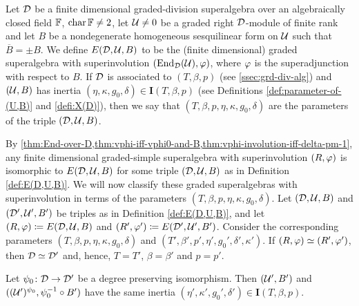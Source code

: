 \begin{defi}\label{def:E(D,U,B)}
	Let $\mathcal{D}$ be a finite dimensional graded-division superalgebra over an algebraically closed field $\mathbb{F}$, $\operatorname{char} \mathbb{F} \neq 2$, let $\mathcal U\neq 0$ be a graded right $\mathcal{D}$-module of finite rank and let $B$ be a nondegenerate homogeneous sesquilinear form on $\mathcal U$ such that $\overline{B} = \pm B$.
	We define $E(\mathcal{D}, \mathcal U, B)$ to be the (finite dimensional) graded superalgebra with superinvolution $(\operatorname{End}_{\mathcal{D}}(\mathcal U), \varphi)$, where $\varphi$ is the superadjunction with respect to $B$.
	If $\mathcal{D}$ is associated to $(T, \beta, p)$ (see \cref{ssec:grd-div-alg}) and $(\mathcal U, B)$ has inertia $(\eta, \kappa, g_0, \delta) \in \mathbf{I}(T, \beta, p)$ (see Definitions \ref{def:parameter-of-(U,B)} and \ref{defi:X(D)}), then we say that $(T, \beta, p, \eta, \kappa, g_0, \delta)$ are the parameters of the triple $(\mathcal{D}, \mathcal U, B)$.
\end{defi}

By \cref{thm:End-over-D,thm:vphi-iff-vphi0-and-B,thm:vphi-involution-iff-delta-pm-1}, any finite dimensional graded-simple superalgebra with superinvolution $(R, \varphi)$ is isomorphic to $E(\mathcal{D}, \mathcal U, B)$ for some triple $(\mathcal{D}, \mathcal U, B)$ as in Definition \ref{def:E(D,U,B)}.
We will now classify these graded superalgebras with superinvolution in terms of the parameters $(T, \beta, p, \eta, \kappa, g_0, \delta)$.
Let $(\mathcal{D}, \mathcal U, B)$ and $(\mathcal{D}', \mathcal U', B')$ be triples as in Definition \ref{def:E(D,U,B)}, and let $(R, \varphi) \coloneqq E(\mathcal{D}, \mathcal U, B)$ and $(R', \varphi') \coloneqq E(\mathcal{D}', \mathcal U', B')$.
Consider the corresponding parameters $(T, \beta, p, \eta, \kappa, g_0, \delta)$ and $(T', \beta', p', \eta', g_0', \delta', \kappa')$.
If $(R, \varphi) \simeq (R', \varphi')$, then $\mathcal{D} \simeq \mathcal{D}'$ and, hence, $T = T'$, $\beta = \beta'$ and $p = p'$.

\begin{lemma}\label{lemma:twist-same-inertia}
	Let $\psi_0\colon \mathcal{D} \to \mathcal{D}'$ be a degree preserving isomorphism.
	Then $(\mathcal U',B')$ and $((\mathcal U')^{\psi_0}, \psi_0^{-1} \circ B')$ have the same inertia $(\eta', \kappa', g_0', \delta') \in \mathbf{I}(T, \beta, p)$.
\end{lemma}

